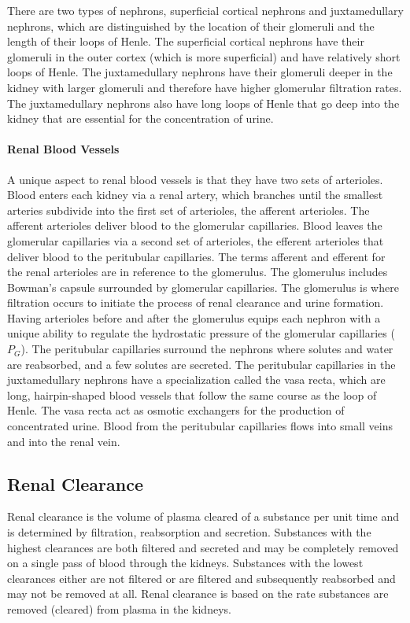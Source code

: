 There are two types of nephrons, superficial cortical nephrons and juxtamedullary nephrons, which are distinguished by the location of their glomeruli and the length of their loops of Henle. The superficial cortical nephrons have their glomeruli in the outer cortex (which is more superficial) and have relatively short loops of Henle. The juxtamedullary nephrons have their glomeruli deeper in the kidney with larger glomeruli and therefore have higher glomerular filtration rates. The juxtamedullary nephrons also have long loops of Henle that go deep into the kidney that are essential for the concentration of urine. 

\paragraph{Renal Blood Vessels}
A unique aspect to renal blood vessels is that they have two sets of arterioles. Blood enters each kidney via a renal artery, which branches until the smallest arteries subdivide into the first set of arterioles, the afferent arterioles. The afferent arterioles deliver blood to the glomerular capillaries. Blood leaves the glomerular capillaries via a second set of arterioles, the efferent arterioles that deliver blood to the peritubular capillaries. The terms afferent and efferent for the renal arterioles are in reference to the glomerulus. The glomerulus includes Bowman’s capsule surrounded by glomerular capillaries. The glomerulus is where filtration occurs to initiate the process of renal clearance and urine formation. Having arterioles before and after the glomerulus equips each nephron with a unique ability to regulate the hydrostatic pressure of the glomerular capillaries ($P_G$). The peritubular capillaries surround the nephrons where solutes and water are reabsorbed, and a few solutes are secreted. The peritubular capillaries in the juxtamedullary nephrons have a specialization called the vasa recta, which are long, hairpin-shaped blood vessels that follow the same course as the loop of Henle. The vasa recta act as osmotic exchangers for the production of concentrated urine. Blood from the peritubular capillaries flows into small veins and into the renal vein.

\subsection{Renal Clearance}

Renal clearance is the volume of plasma cleared of a substance per unit time and is determined by filtration, reabsorption and secretion. Substances with the highest clearances are both filtered and secreted and may be completely removed on a single pass of blood through the kidneys. Substances with the lowest clearances either are not filtered or are filtered and subsequently reabsorbed and may not be removed at all.  Renal clearance is based on the rate substances are removed (cleared) from plasma in the kidneys.

